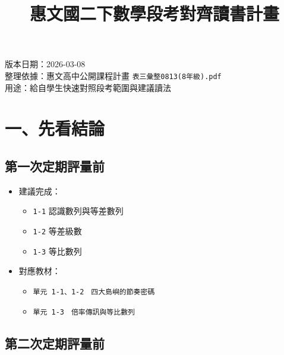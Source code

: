 \documentclass[
  chinese,
  12pt,
  a4paper,
  oneside]{article}
\title{惠文國二下數學段考對齊讀書計畫}
\author{}
\date{}
\providecommand{\tightlist}{%
  \setlength{\itemsep}{0pt}\setlength{\parskip}{0pt}}
\begin{document}
\maketitle

{
\setcounter{tocdepth}{2}
\tableofcontents
}
版本日期：2026-03-08\\
整理依據：惠文高中公開課程計畫 \texttt{表三彙整0813(8年級).pdf}\\
用途：給自學生快速對照段考範圍與建議讀法

\section{一、先看結論}\label{ux4e00ux5148ux770bux7d50ux8ad6}

\subsection{第一次定期評量前}\label{ux7b2cux4e00ux6b21ux5b9aux671fux8a55ux91cfux524d}

\begin{itemize}
\tightlist
\item
  建議完成：

  \begin{itemize}
  \tightlist
  \item
    \texttt{1-1} 認識數列與等差數列
  \item
    \texttt{1-2} 等差級數
  \item
    \texttt{1-3} 等比數列
  \end{itemize}
\item
  對應教材：

  \begin{itemize}
  \tightlist
  \item
    \texttt{單元\ 1-1、1-2　四大島嶼的節奏密碼}
  \item
    \texttt{單元\ 1-3　倍率傳訊與等比數列}
  \end{itemize}
\end{itemize}

\subsection{第二次定期評量前}\label{ux7b2cux4e8cux6b21ux5b9aux671fux8a55ux91cfux524d}
\end{document}
